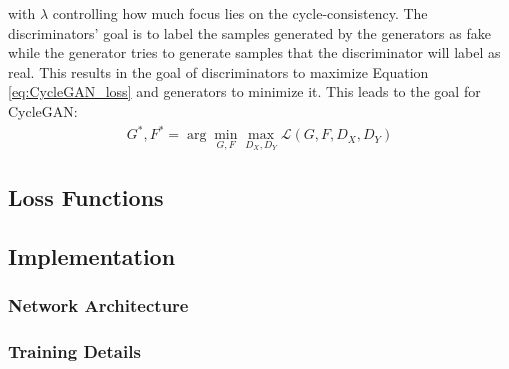 with $\lambda$ controlling how much focus lies on the cycle-consistency. The discriminators' goal is to label the samples generated by the generators as fake while the generator tries to generate samples that the discriminator will label as real. This results in the goal of discriminators to maximize Equation \ref{eq:CycleGAN_loss} and generators to minimize it. This leads to the goal for CycleGAN: 
\begin{align}
	G^*, F^* = \arg \underset{G,F}{\min}\underset{D_X, D_Y}{\max} \mathcal{L}(G,F,D_X,D_Y) \label{eq:GAN_goal}
\end{align}

\subsection{Loss Functions}
\subsection{Implementation}
\subsubsection{Network Architecture}
\subsubsection{Training Details}


